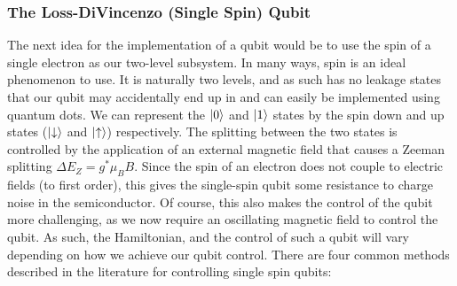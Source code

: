 \subsubsection{The Loss-DiVincenzo (Single Spin) Qubit}
The next idea for the implementation of a qubit would be to use the spin of a single electron as our two-level subsystem. In
many ways, spin is an ideal phenomenon to use. It is naturally two levels, and as such has no leakage states that our qubit
may accidentally end up in and can easily be implemented using quantum dots\cite{PhysRevA.57.120}. We can represent the $\ket{0}$ and $\ket{1}$ states
by the spin down and up states ($\ket{\downarrow}$ and $\ket{\uparrow}$) respectively. The splitting between the two states
is controlled by the application of an external magnetic field that causes a Zeeman splitting $\Delta E_Z = g^* \mu_B B$. Since the
spin of an electron does not couple to electric fields (to first order), this gives the single-spin qubit some resistance to
charge noise in the semiconductor. Of course, this also makes the control of the qubit more challenging, as we now require
an oscillating magnetic field to control the qubit. As such, the Hamiltonian, and the control of such a qubit will vary depending on
how we achieve our qubit control. There are four common methods described in the literature for controlling
single spin qubits:
